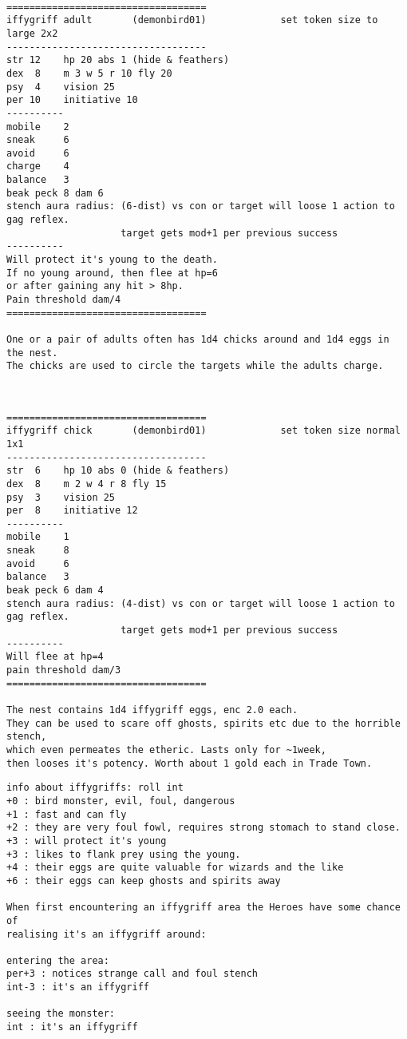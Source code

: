 \

\goodbreak \begin{samepage} \small \begin{verbatim}
===================================
iffygriff adult       (demonbird01)             set token size to large 2x2
-----------------------------------
str 12    hp 20 abs 1 (hide & feathers)
dex  8    m 3 w 5 r 10 fly 20
psy  4    vision 25
per 10    initiative 10
----------
mobile    2
sneak     6
avoid     6
charge    4
balance   3
beak peck 8 dam 6
stench aura radius: (6-dist) vs con or target will loose 1 action to gag reflex.
                    target gets mod+1 per previous success
----------
Will protect it's young to the death.
If no young around, then flee at hp=6
or after gaining any hit > 8hp.
Pain threshold dam/4
===================================

One or a pair of adults often has 1d4 chicks around and 1d4 eggs in the nest.
The chicks are used to circle the targets while the adults charge.
\end{verbatim} \normalsize \end{samepage}

\

\goodbreak \begin{samepage} \small \begin{verbatim}
===================================
iffygriff chick       (demonbird01)             set token size normal 1x1
-----------------------------------
str  6    hp 10 abs 0 (hide & feathers)
dex  8    m 2 w 4 r 8 fly 15
psy  3    vision 25
per  8    initiative 12
----------
mobile    1
sneak     8
avoid     6
balance   3
beak peck 6 dam 4
stench aura radius: (4-dist) vs con or target will loose 1 action to gag reflex.
                    target gets mod+1 per previous success
----------
Will flee at hp=4
pain threshold dam/3
===================================

The nest contains 1d4 iffygriff eggs, enc 2.0 each.
They can be used to scare off ghosts, spirits etc due to the horrible stench,
which even permeates the etheric. Lasts only for ~1week,
then looses it's potency. Worth about 1 gold each in Trade Town.
\end{verbatim} \end{samepage} \goodbreak \begin{samepage} \begin{verbatim}
info about iffygriffs: roll int
+0 : bird monster, evil, foul, dangerous
+1 : fast and can fly
+2 : they are very foul fowl, requires strong stomach to stand close.
+3 : will protect it's young
+3 : likes to flank prey using the young.
+4 : their eggs are quite valuable for wizards and the like
+6 : their eggs can keep ghosts and spirits away

When first encountering an iffygriff area the Heroes have some chance of
realising it's an iffygriff around:

entering the area:
per+3 : notices strange call and foul stench
int-3 : it's an iffygriff

seeing the monster:
int : it's an iffygriff
\end{verbatim} \normalsize \end{samepage}

